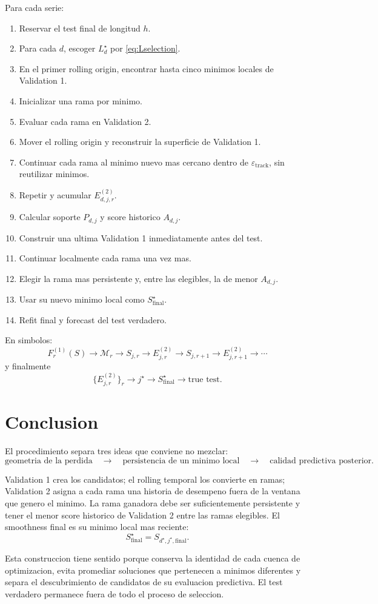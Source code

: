 \documentclass[11pt]{article}
\begin{document}
Para cada serie:
\begin{enumerate}[leftmargin=2.4em]
    \item Reservar el test final de longitud \(h\).
    \item Para cada \(d\), escoger \(L_d^\star\) por
    \eqref{eq:Lselection}.
    \item En el primer rolling origin, encontrar hasta cinco minimos locales de
    Validation 1.
    \item Inicializar una rama por minimo.
    \item Evaluar cada rama en Validation 2.
    \item Mover el rolling origin y reconstruir la superficie de Validation 1.
    \item Continuar cada rama al minimo nuevo mas cercano dentro de
    \(\varepsilon_{\mathrm{track}}\), sin reutilizar minimos.
    \item Repetir y acumular \(E^{(2)}_{d,j,r}\).
    \item Calcular soporte \(P_{d,j}\) y score historico \(A_{d,j}\).
    \item Construir una ultima Validation 1 inmediatamente antes del test.
    \item Continuar localmente cada rama una vez mas.
    \item Elegir la rama mas persistente y, entre las elegibles, la de menor
    \(A_{d,j}\).
    \item Usar su nuevo minimo local como \(S_{\mathrm{final}}^\star\).
    \item Refit final y forecast del test verdadero.
\end{enumerate}

En simbolos:
\[
F^{(1)}_r(S)
\to
\mathcal{M}_r
\to
S_{j,r}
\to
E^{(2)}_{j,r}
\to
S_{j,r+1}
\to
E^{(2)}_{j,r+1}
\to
\cdots
\]
y finalmente
\[
\{E^{(2)}_{j,r}\}_r
\to
j^\star
\to
S_{\mathrm{final}}^\star
\to
\text{true test}.
\]

\section{Conclusion}

El procedimiento separa tres ideas que conviene no mezclar:
\[
\text{geometria de la perdida}
\quad
\longrightarrow
\quad
\text{persistencia de un minimo local}
\quad
\longrightarrow
\quad
\text{calidad predictiva posterior}.
\]

Validation 1 crea los candidatos; el rolling temporal los convierte en ramas;
Validation 2 asigna a cada rama una historia de desempeno fuera de la ventana
que genero el minimo. La rama ganadora debe ser suficientemente persistente y
tener el menor score historico de Validation 2 entre las ramas elegibles. El
smoothness final es su minimo local mas reciente:
\[
\boxed{
S_{\mathrm{final}}^\star
=
S_{d^\star,j^\star,\mathrm{final}}.
}
\]

Esta construccion tiene sentido porque conserva la identidad de cada cuenca de
optimizacion, evita promediar soluciones que pertenecen a minimos diferentes y
separa el descubrimiento de candidatos de su evaluacion predictiva. El test
verdadero permanece fuera de todo el proceso de seleccion.
\end{document}
